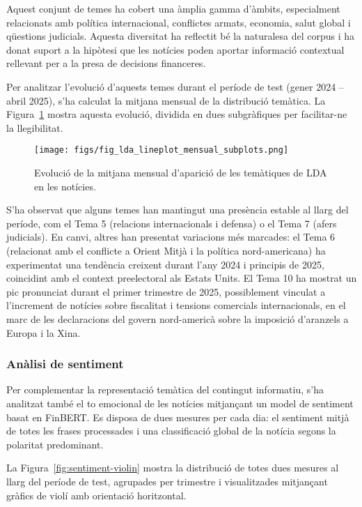 \documentclass[12pt,a4paper,twoside]{book}
\begin{document}
Aquest conjunt de temes ha cobert una àmplia gamma d’àmbits, especialment relacionats amb política internacional, conflictes armats, economia, salut global i qüestions judicials. Aquesta diversitat ha reflectit bé la naturalesa del corpus i ha donat suport a la hipòtesi que les notícies poden aportar informació contextual rellevant per a la presa de decisions financeres.

Per analitzar l’evolució d’aquests temes durant el període de test (gener 2024 – abril 2025), s’ha calculat la mitjana mensual de la distribució temàtica. La Figura~\ref{fig:lda-evol} mostra aquesta evolució, dividida en dues subgràfiques per facilitar-ne la llegibilitat.

\begin{figure}[H]
	\centering
	\texttt{[image: figs/fig\_lda\_lineplot\_mensual\_subplots.png]}
	\caption{Evolució de la mitjana mensual d'aparició de les temàtiques de LDA en les notícies.}
	\label{fig:lda-evol}
\end{figure}

S’ha observat que alguns temes han mantingut una presència estable al llarg del període, com el Tema 5 (relacions internacionals i defensa) o el Tema 7 (afers judicials). En canvi, altres han presentat variacions més marcades: el Tema 6 (relacionat amb el conflicte a Orient Mitjà i la política nord-americana) ha experimentat una tendència creixent durant l’any 2024 i principis de 2025, coincidint amb el context preelectoral als Estats Units. El Tema 10 ha mostrat un pic pronunciat durant el primer trimestre de 2025, possiblement vinculat a l’increment de notícies sobre fiscalitat i tensions comercials internacionals, en el marc de les declaracions del govern nord-americà sobre la imposició d’aranzels a Europa i la Xina.


\subsubsection{Anàlisi de sentiment}

Per complementar la representació temàtica del contingut informatiu, s’ha analitzat també el to emocional de les notícies mitjançant un model de sentiment basat en FinBERT. Es disposa de dues mesures per cada dia: el sentiment mitjà de totes les frases processades i una classificació global de la notícia segons la polaritat predominant.

La Figura~\ref{fig:sentiment-violin} mostra la distribució de totes dues mesures al llarg del període de test, agrupades per trimestre i visualitzades mitjançant gràfics de violí amb orientació horitzontal.
\end{document}
